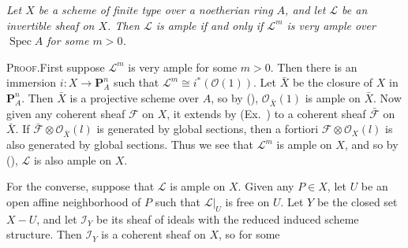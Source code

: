 { \emph{Let $X$ be a scheme of finite type over a noetherian ring $A$, and let $\mathcal L$ be an invertible sheaf on $X$. Then $\mathcal L$ is ample if and only if $\mathcal L^m$ is very ample over $\operatorname{Spec}A$ for some $m>0$.}

\par\smallskip\noindent\textsc{Proof.}\enspace First suppose $\mathcal L^m$ is very ample for some $m>0$. Then there is an immersion $i\colon X\to\mathbf P_A^n$ such that $\mathcal L^m\cong i^*(\mathcal O(1))$. Let $\bar X$ be the closure of $X$ in $\mathbf P_A^n$. Then $\bar X$ is a projective scheme over $A$, so by (), $\mathcal O_{\bar X}(1)$ is ample on $\bar X$. Now given any coherent sheaf $\mathcal F$ on $X$, it extends by (Ex.\ ) to a coherent sheaf $\bar{\mathcal F}$ on $\bar X$. If $\bar{\mathcal F}\otimes\mathcal O_{\bar X}(l)$ is generated by global sections, then a fortiori $\mathcal F\otimes\mathcal O_X(l)$ is also generated by global sections. Thus we see that $\mathcal L^m$ is ample on $X$, and so by (), $\mathcal L$ is also ample on $X$.

For the converse, suppose that $\mathcal L$ is ample on $X$. Given any $P\in X$, let $U$ be an open affine neighborhood of $P$ such that $\mathcal L|_U$ is free on $U$. Let $Y$ be the closed set $X-U$, and let $\mathcal I_Y$ be its sheaf of ideals with the reduced induced scheme structure. Then $\mathcal I_Y$ is a coherent sheaf on $X$, so for some
}
